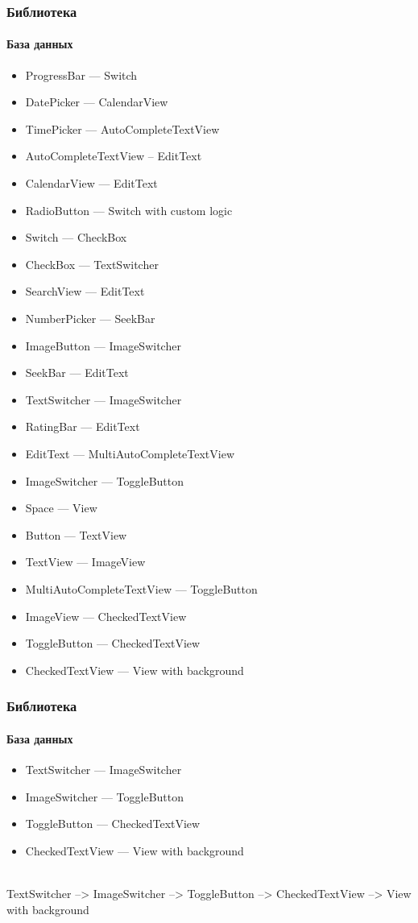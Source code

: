 \documentclass{beamer}
\begin{document}
    \begin{frame}
        \frametitle{Библиотека}
        \framesubtitle{База данных}
        {\scriptsize \begin{multicols}{2}
            \begin{itemize}
                \item ProgressBar --- Switch
                \item DatePicker --- CalendarView
                \item TimePicker --- AutoCompleteTextView
                \item AutoCompleteTextView – EditText
                \item CalendarView --- EditText
                \item RadioButton --- Switch with custom logic
                \item Switch --- CheckBox
                \item CheckBox --- TextSwitcher
                \item SearchView --- EditText
                \item NumberPicker --- SeekBar
                \item ImageButton --- ImageSwitcher
                \item SeekBar --- EditText
                \item TextSwitcher --- ImageSwitcher
                \item RatingBar --- EditText
                \item EditText --- MultiAutoCompleteTextView
                \item ImageSwitcher --- ToggleButton
                \item Space --- View
                \item Button --- TextView
                \item TextView --- ImageView
                \item MultiAutoCompleteTextView --- ToggleButton
                \item ImageView --- CheckedTextView
                \item ToggleButton --- CheckedTextView
                \item CheckedTextView --- View with background
            \end{itemize}
        \end{multicols}}
    \end{frame}
    \begin{frame}
        \frametitle{Библиотека}
        \framesubtitle{База данных}
        \begin{itemize}
            \item TextSwitcher --- ImageSwitcher
            \item ImageSwitcher --- ToggleButton
            \item ToggleButton --- CheckedTextView
            \item CheckedTextView --- View with background
        \end{itemize}~\\
        TextSwitcher --> ImageSwitcher --> ToggleButton --> CheckedTextView --> View with background
    \end{frame}
\end{document}
